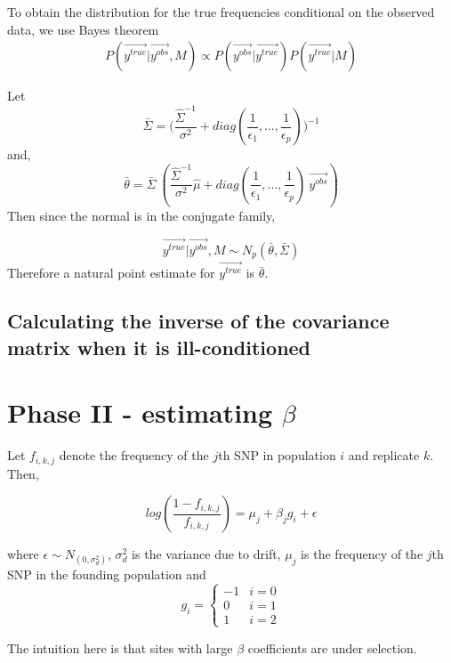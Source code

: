 \documentclass[10pt,a4paper,draft]{article}
\begin{document}
To obtain the distribution for the true frequencies conditional on the observed data, we use Bayes theorem 
\begin{align*}
P(\vec{y^{true}} | \vec{y^{obs}}, M) \propto P(\vec{y^{obs}} | \vec{y^{true}}) P(\vec{y^{true}}|M)
\end{align*}

Let
\begin{equation}
\bar{\Sigma} = \big(\frac{\hat{\Sigma}^{-1}}{\sigma^2} + diag(\frac{1}{\epsilon_1},..., \frac{1}{\epsilon_p})\big)^{-1}
\end{equation}
and,
\begin{equation}
\bar{\theta} = \bar{\Sigma} \ (\frac{\hat{\Sigma}^{-1}}{\sigma^2}\hat{\mu} + diag(\frac{1}{\epsilon_1},..., \frac{1}{\epsilon_p}) \ \vec{y^{obs}})
\end{equation}
Then since the normal is in the conjugate family,

\begin{equation}
\vec{y^{true}} | \vec{y^{obs}}, M \sim N_p(\bar{\theta}, \bar{\Sigma})
\end{equation}
Therefore a natural point estimate for $\vec{y^{true}}$ is $\bar{\theta}$.

\subsection{Calculating the inverse of the covariance matrix when it is ill-conditioned}

\section{Phase II - estimating $\beta$}
Let $f_{i,k,j}$ denote the frequency of the $j$th SNP in population $i$ and replicate $k$. Then,

\begin{equation}
log(\frac{1-f_{i,k,j}}{f_{i,k,j}}) = \mu_j + \beta_{j} g_i + \epsilon
\end{equation}

where $\epsilon \sim N_(0, \sigma_d^2)$, $\sigma_d^2$ is the variance due to drift, $\mu_j$ is the frequency of the $j$th SNP in the founding population and 
\[
   g_{i} = \left\{
     \begin{array}{lr}
       -1 &  i =0\\
        0 &  i =1 \\
        1 &  i =2
     \end{array}
   \right.
\]

The intuition here is that sites with large $\beta$ coefficients are under selection.
\end{document}
